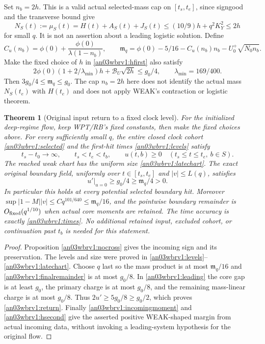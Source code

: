 \documentclass[11pt]{article}
\numberwithin{equation}{section}
\newtheorem{theorem}{Theorem}[section]
\theoremstyle{remark}\newtheorem{remark}[theorem]{Remark}
\newcommand{\ph}{\phi(0)}\newcommand{\WW}{\mathcal W}
\begin{document}
Set $n_b=2h$. This is a valid actual selected-mass cap on
$[t_s,t_e]$, since signgood and the transverse bound give
\[
 N_S(t):=\mu_S(t)=H(t)+A_S(t)+J_S(t)
 \le(10/9)h+q^2K_Y^2\le2h
\]
for small $q$. It is not an assertion about a leading logistic solution.
Define
\begin{equation}
 C_u(n_b)=\ph+\frac{\ph}{\lambda(1-n_b)},\qquad
 \mathfrak m_q=\ph-5/16-C_u(n_b)n_b-U_0^+\sqrt{N_0n_b}.
 \label{an03wbrv1:margin}
\end{equation}
Make the fixed choice of $h$ in \eqref{an03wbrv1:hfirst} also satisfy
\begin{equation}
 2\ph(1+2/\lambda_{\min})h+\mathcal B_U\sqrt{2h}\le g_0/4,
 \qquad\lambda_{\min}=169/400.
 \label{an03wbrv1:hsecond}
\end{equation}
Then $3g_0/4\le\mathfrak m_q\le g_0$. The cap $n_b=2h$ here
does not identify the actual mass $N_S(t_e)$ with $H(t_e)$ and does
not apply WEAK's contraction or logistic theorem.

\begin{theorem}[Original input return to a fixed clock level]
\label{an03wbrv1:main}
For the initialized deep-regime flow, keep WPT/RB's fixed constants,
then make the fixed choices above. For every sufficiently small $q$,
the entire closed clock cohort \eqref{an03wbrv1:selected} and the
first-hit times \eqref{an03wbrv1:levels} satisfy
\[
 t_s-t_0\longrightarrow\infty,\qquad t_s<t_e<t_b,\qquad
 u(t,b)\ge0\quad(t_s\le t\le t_e,\ b\in S).
\]
The reached weak chart has the uniform size
\eqref{an03wbrv1:latechart}. The exact original boundary field,
uniformly over $t\in[t_s,t_e]$ and $|v|\le L(q)$, satisfies
\begin{equation}
 u'|_{u=0}\ge g_0/4\ge\mathfrak m_q/4>0.
 \label{an03wbrv1:return}
\end{equation}
In particular this holds at every potential selected boundary hit.
Moreover $\sup|1-M||v|\le Cq^{101/640}\le\mathfrak m_q/16$,
and the pointwise boundary remainder is
$O_{\rm fixed}(q^{1/10})$ when actual core moments are retained.
The time accuracy is exactly \eqref{an03wbrv1:times}.
No additional retained input, excluded cohort, or continuation past
$t_b$ is needed for this statement.
\end{theorem}
\begin{proof}
Proposition \ref{an03wbrv1:nocross} gives the incoming sign and
its preservation. The levels and size were proved in
\eqref{an03wbrv1:levels}--\eqref{an03wbrv1:latechart}.
Choose $q$ last so the mass product is at most $\mathfrak m_q/16$
and \eqref{an03wbrv1:finalremainder} is at most $g_0/8$.
In \eqref{an03wbrv1:leading} the core gap is at least $g_0$,
the primary charge is at most $g_0/8$, and the remaining mass-linear
charge is at most $g_0/8$. Thus $2u'\ge5g_0/8\ge g_0/2$,
which proves \eqref{an03wbrv1:return}. Finally
\eqref{an03wbrv1:incomingmoment} and \eqref{an03wbrv1:hsecond}
give the asserted positive WEAK-shaped margin from actual incoming
data, without invoking a leading-system hypothesis for the original flow.
\end{proof}
\end{document}
